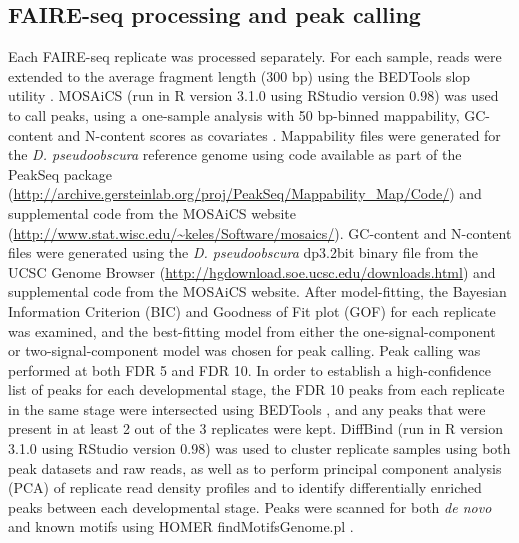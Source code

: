 \subsection{FAIRE-seq processing and peak calling}
Each FAIRE-seq replicate was processed separately. For each sample, reads were extended to the average fragment length (300 bp) using the BEDTools slop utility \citep{quinlan_bedtools:_2010}. MOSAiCS (run in R version 3.1.0 using RStudio version 0.98) was used to call peaks, using a one-sample analysis with 50 bp-binned mappability, GC-content and N-content scores as covariates \citep{chung_mosaics_2012}. Mappability files were generated for the \emph{D. pseudoobscura} reference genome using code available as part of the PeakSeq package (\url{http://archive.gersteinlab.org/proj/PeakSeq/Mappability_Map/Code/}) \citep{rozowsky_peakseq_2009} and supplemental code from the MOSAiCS website (\url{http://www.stat.wisc.edu/~keles/Software/mosaics/}). GC-content and N-content files were generated using the \emph{D. pseudoobscura} dp3.2bit binary file from the UCSC Genome Browser (\url{http://hgdownload.soe.ucsc.edu/downloads.html}) and supplemental code from the MOSAiCS website. After model-fitting, the Bayesian Information Criterion (BIC) and Goodness of Fit plot (GOF) for each replicate was examined, and the best-fitting model from either the one-signal-component or two-signal-component model was chosen for peak calling. Peak calling was performed at both FDR 5 and FDR 10. In order to establish a high-confidence list of peaks for each developmental stage, the FDR 10 peaks from each replicate in the same stage were intersected using BEDTools \citep{quinlan_bedtools:_2010}, and any peaks that were present in at least 2 out of the 3 replicates were kept. DiffBind (run in R version 3.1.0 using RStudio version 0.98) was used to cluster replicate samples using both peak datasets and raw reads, as well as to perform principal component analysis (PCA) of replicate read density profiles and to identify differentially enriched peaks between each developmental stage. Peaks were scanned for both \emph{de novo} and known motifs using HOMER findMotifsGenome.pl \citep{heinz_simple_2010}.\\

